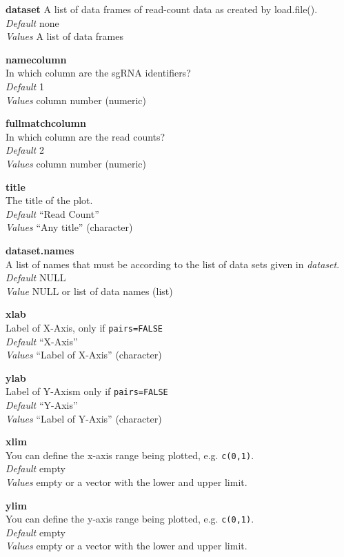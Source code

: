 \documentclass[]{article}
\begin{document}
\textbf{dataset} A list of data frames of read-count data as created by
load.file().\\
\emph{Default} none\\
\emph{Values} A list of data frames

\textbf{namecolumn}\\
In which column are the sgRNA identifiers?\\
\emph{Default} 1\\
\emph{Values} column number (numeric)

\textbf{fullmatchcolumn}\\
In which column are the read counts?\\
\emph{Default} 2\\
\emph{Values} column number (numeric)

\textbf{title}\\
The title of the plot.\\
\emph{Default} ``Read Count''\\
\emph{Values} ``Any title'' (character)

\textbf{dataset.names}\\
A list of names that must be according to the list of data sets given in
\emph{dataset}.\\
\emph{Default} NULL\\
\emph{Value} NULL or list of data names (list)

\textbf{xlab}\\
Label of X-Axis, only if \texttt{pairs=FALSE}\\
\emph{Default} ``X-Axis''\\
\emph{Values} ``Label of X-Axis'' (character)

\textbf{ylab}\\
Label of Y-Axism only if \texttt{pairs=FALSE}\\
\emph{Default} ``Y-Axis''\\
\emph{Values} ``Label of Y-Axis'' (character)

\textbf{xlim}\\
You can define the x-axis range being plotted, e.g. \texttt{c(0,1)}.\\
\emph{Default} empty\\
\emph{Values} empty or a vector with the lower and upper limit.

\textbf{ylim}\\
You can define the y-axis range being plotted, e.g. \texttt{c(0,1)}.\\
\emph{Default} empty\\
\emph{Values} empty or a vector with the lower and upper limit.
\end{document}
